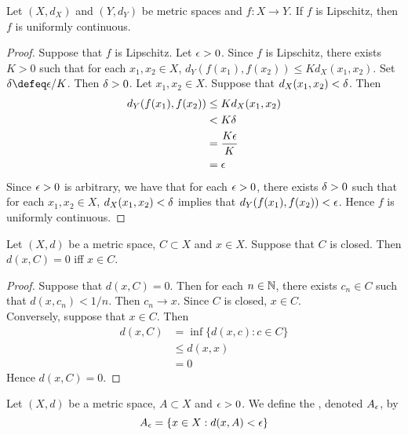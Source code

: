 \documentclass{book}
\begin{document}
\begin{ex} 
	Let $(X, d_X)$ and $(Y, d_Y)$ be metric spaces and $f:X \rightarrow Y$. If $f$ is Lipschitz, then $f$ is uniformly continuous.
\end{ex}

\begin{proof}
	Suppose that $f$ is Lipschitz. Let $\epsilon > 0$. Since $f$ is Lipschitz, there exists $K > 0$ such that for each $x_1, x_2 \in X$, $d_Y(f(x_1), f(x_2)) \leq K d_X(x_1, x_2)$. Set $\del \defeq \ep/K$. Then $\delta > 0$. Let $x_1, x_2 \in X$. Suppose that $d_X(x_1, x_2) < \delta$. Then
	\begin{align*}
		d_Y(f(x_1), f(x_2))
		& \leq K d_X(x_1, x_2) \\
		& < K \delta \\
		& = \frac{K \epsilon}{K} \\
		& = \epsilon 
	\end{align*}
	Since $\epsilon > 0$ is arbitrary, we have that for each $\epsilon > 0$, there exists $\delta > 0$ such that for each $x_1, x_2 \in X$, $d_X(x_1, x_2) < \delta$ implies that $d_Y(f(x_1), f(x_2)) < \epsilon$. Hence $f$ is uniformly continuous.
\end{proof}

\begin{ex} 
	Let $(X, d)$ be a metric space, $C \subset X$ and $x \in X$. Suppose that $C$ is closed. Then $d(x, C) = 0$ iff $x \in C$.
\end{ex}

\begin{proof}
	Suppose that $d(x, C) = 0$. Then for each $n \in \mathbb{N}$, there exists $c_n \in C$ such that $d(x, c_n) < 1/n$. Then $c_n \rightarrow x$. Since $C$ is closed, $x \in C$. \\
	Conversely, suppose that $x \in C$. Then 
	\begin{align*}
		d(x, C)
		& = \inf \{d(x, c): c \in C\} \\
		& \leq d(x, x) \\
		& = 0
	\end{align*}
	Hence $d(x, C) = 0$.
\end{proof}

\begin{defn} 
	Let $(X, d)$ be a metric space, $A \subset X$ and $\epsilon >0$. We define the , denoted $A_{\epsilon}$, by 
	$$A_{\epsilon} = \{x \in X: d(x, A) < \epsilon\}$$ 
\end{defn}
\end{document}
